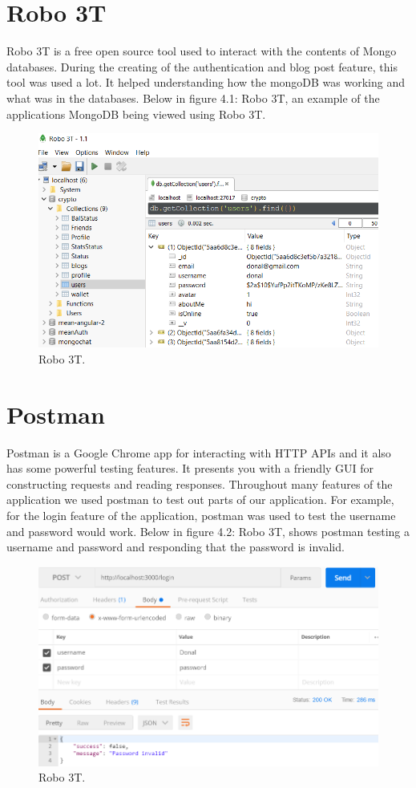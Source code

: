\section{Robo 3T}
Robo 3T is a free open source tool used to interact with the contents of Mongo databases\cite{Robo3Tfo20}. During the creating of the authentication and blog post feature, this tool was used a lot. It helped understanding how the mongoDB was working and what was in the databases. Below in figure 4.1: Robo 3T, an example of the applications MongoDB being viewed using Robo 3T.

\begin{figure}[H]
\centering
\includegraphics[]{img/Robo3T.png}
\caption{Robo 3T.}
\end{figure}

\section{Postman}
Postman is a Google Chrome app for interacting with HTTP APIs and it also has some powerful testing features. It presents you with a friendly GUI for constructing requests and reading responses\cite{APITesti56}. Throughout many features of the application we used postman to test out parts of our application. For example, for the login feature of the application, postman was used to test the username and password would work. Below in figure 4.2: Robo 3T, shows postman testing a username and password and responding that the password is invalid.

\begin{figure}[H]
\centering
\includegraphics[]{img/postman.png}
\caption{Robo 3T.}
\end{figure}


